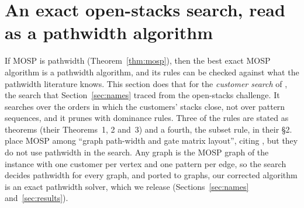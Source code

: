 \section{An exact open-stacks search, read as a pathwidth algorithm}
\label{sec:search}

If MOSP is pathwidth (Theorem~\ref{thm:mosp}), then the best exact MOSP
algorithm is a pathwidth algorithm, and its rules can be checked against what
the pathwidth literature knows. This section does that for the \emph{customer
search} of \citet{ChuStuckey2009}, the search that Section~\ref{sec:names}
traced from the open-stacks challenge. It searches over the orders in which the
customers' stacks close, not over pattern sequences, and it prunes with
dominance rules. Three of the rules are stated as theorems (their Theorems~1,
2 and~3) and a fourth, the subset rule, in their \S2. \citet{ChuStuckey2009}
place MOSP among ``graph path-width and gate matrix layout'', citing
\citet{LY2002}, but they do not use pathwidth in the search. Any graph is the
MOSP graph of the instance with one customer per vertex and one pattern per
edge, so the search decides pathwidth for every graph, and ported to graphs,
our corrected algorithm is an exact pathwidth solver, which we release (Sections~\ref{sec:names} and~\ref{sec:results}).

